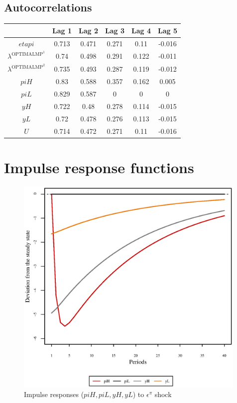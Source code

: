 \subsection{Autocorrelations}

\begin{tabular}{c|ccccc|}
  & Lag 1 & Lag 2 & Lag 3 & Lag 4 & Lag 5\\
\hline
${e\!t\!a\!p\!i}$ & 0.713 & 0.471 & 0.271 & 0.11 & -0.016 \\
$\lambda^{\mathrm{OPTIMALMP}^{\mathrm{1}}}$ & 0.74 & 0.498 & 0.291 & 0.122 & -0.011 \\
$\lambda^{\mathrm{OPTIMALMP}^{\mathrm{2}}}$ & 0.735 & 0.493 & 0.287 & 0.119 & -0.012 \\
${p\!i\!H}$ & 0.83 & 0.588 & 0.357 & 0.162 & 0.005 \\
${p\!i\!L}$ & 0.829 & 0.587 & 0 & 0 & 0 \\
${y\!H}$ & 0.722 & 0.48 & 0.278 & 0.114 & -0.015 \\
${y\!L}$ & 0.72 & 0.478 & 0.276 & 0.113 & -0.015 \\
$U$ & 0.714 & 0.472 & 0.271 & 0.11 & -0.016 \\
\hline
\end{tabular}



\pagebreak

\section{Impulse response functions}

\begin{figure}[h]
\centering
\begin{minipage}{0.5\textwidth}
\vspace*{-3em}
\centering
\includegraphics[width=0.99\textwidth, scale=0.55]{plots/plot_1.eps}
\caption{Impulse responses (${p\!i\!H}, {p\!i\!L}, {y\!H}, {y\!L}$) to $\epsilon^{\pi}$ shock}
\end{minipage}
\end{figure}
